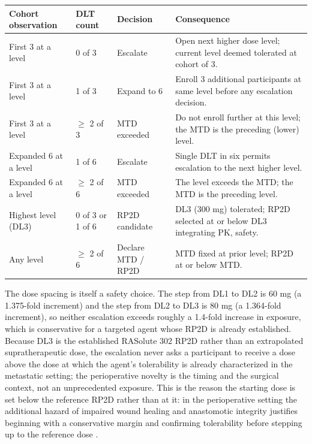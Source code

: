 \noindent\begin{tabularx}{\textwidth}{L{2.6cm} L{2.4cm} L{3.4cm} Y}
\toprule
\textbf{Cohort observation} & \textbf{DLT count} & \textbf{Decision} & \textbf{Consequence} \\
\midrule
First 3 at a level & 0 of 3 & Escalate & Open next higher dose level; current level deemed tolerated at cohort of 3. \\
\addlinespace
First 3 at a level & 1 of 3 & Expand to 6 & Enroll 3 additional participants at same level before any escalation decision. \\
\addlinespace
First 3 at a level & $\geq$ 2 of 3 & MTD exceeded & Do not enroll further at this level; the MTD is the preceding (lower) level. \\
\addlinespace
Expanded 6 at a level & 1 of 6 & Escalate & Single DLT in six permits escalation to the next higher level. \\
\addlinespace
Expanded 6 at a level & $\geq$ 2 of 6 & MTD exceeded & The level exceeds the MTD; the MTD is the preceding level. \\
\addlinespace
Highest level (DL3) & 0 of 3 or 1 of 6 & RP2D candidate & DL3 (300 mg) tolerated; RP2D selected at or below DL3 integrating PK, safety. \\
\addlinespace
Any level & $\geq$ 2 of 6 & Declare MTD / RP2D & MTD fixed at prior level; RP2D at or below MTD. \\
\bottomrule
\end{tabularx}
\vspace*{-0.3cm}

The dose spacing is itself a safety choice. The step from DL1 to DL2 is 60 mg (a
1.375-fold increment) and the step from DL2 to DL3 is 80 mg (a 1.364-fold
increment), so neither escalation exceeds roughly a 1.4-fold increase in exposure,
which is conservative for a targeted agent whose RP2D is already established. Because
DL3 is the established RASolute 302 RP2D rather than an extrapolated supratherapeutic
dose, the escalation never asks a participant to receive a dose above the dose at
which the agent's tolerability is already characterized in the metastatic setting;
the perioperative novelty is the timing and the surgical context, not an
unprecedented exposure. This is the reason the starting dose is set below the
reference RP2D rather than at it: in the perioperative setting the additional
hazard of impaired wound healing and anastomotic integrity justifies beginning with
a conservative margin and confirming tolerability before stepping up to the
reference dose \cite{daraxwhipple,oncotrialllm}.

